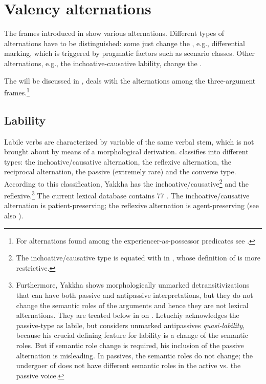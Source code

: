\section{Valency alternations} \label{valclass}
 
The frames introduced in  show various alternations.  Different types of alternations have to be distinguished: some just change the , e.g., differential  marking, which is triggered by pragmatic factors such as  scenario classes. Other alternations, e.g., the inchoative-causative lability, change the . 

The   will be discussed  in ,    deals with the alternations among the three-argument frames.\footnote{For alternations found among the experiencer-as-possessor predicates see .} 


\subsection{Lability}\label{labile}

Labile verbs are characterized by variable  of the same verbal stem, which is not brought about by means of a morphological derivation. \citet[224]{Letuchiy2009Labile} classifies   into different types: the inchoative/causative alternation, the reflexive alternation, the reciprocal alternation, the passive (extremely rare) and the converse type. According to this classification, Yakkha has the inchoative/causative\footnote{The inchoative/causative type is equated with  in \citet{Haspelmath1993More}, whose definition of  is more restrictive.} and the reflexive.\footnote{Furthermore, Yakkha shows morphologically unmarked detransitivizations that can have both passive and antipassive interpretations, but they do not change the semantic roles of the arguments and hence they are not lexical alternations. They are treated below in  on . Letuchiy acknowledges the passive-type as labile, but considers unmarked antipassives \emph{quasi-lability}, because his crucial defining feature for lability is a change of the semantic roles. But if semantic role change is required, his inclusion of the passive alternation is misleading. In passives, the semantic roles do not change; the undergoer of  does not have different semantic roles in the active vs. the passive voice.} The current lexical database contains 77 . The inchoative/causative alternation is patient-preserving; the reflexive alternation is agent-preserving (see also \citealt[223]{Letuchiy2009Labile}). 

